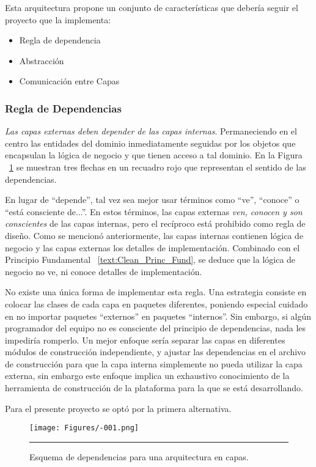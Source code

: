 Esta arquitectura propone un conjunto de características que debería seguir el proyecto que la implementa:

\begin{itemize}
	\item Regla de dependencia
	\item Abstracción
	\item Comunicación entre Capas
\end{itemize}
\subsubsection{Regla de Dependencias}
\emph{Las capas externas deben depender de las capas internas}. Permaneciendo en el centro las entidades del dominio inmediatamente seguidas por los objetos que encapsulan la lógica de negocio y que tienen acceso a tal dominio.  En la Figura ~\ref{fig:Diagrama_clasico} se muestran tres flechas en un recuadro rojo que representan el sentido de las dependencias. 

En lugar de ``depende'', tal vez sea mejor usar términos como ``ve'', ``conoce'' o ``está consciente de...''. En estos términos, las capas externas \emph{ven, conocen y son conscientes} de las capas internas, pero el recíproco está prohibido como regla de diseño. Como se mencionó anteriormente, las capas internas contienen lógica de negocio y las capas externas  los detalles de implementación. Combinado con el Principio Fundamental ~\ref{text:Clean_Princ_Fund}, se deduce que la lógica de negocio no ve, ni conoce detalles de implementación.

No existe una única forma de implementar esta regla. Una estrategia consiste en colocar las clases de cada capa en paquetes diferentes, poniendo especial cuidado en no importar paquetes ``externos'' en paquetes ``internos''. Sin embargo, si algún programador del equipo no es consciente del principio de dependencias, nada les impediría romperlo. Un mejor enfoque sería separar las capas en diferentes módulos de construcción independiente, y ajustar las dependencias en el archivo de construcción para que la capa interna simplemente no pueda utilizar la capa externa, sin embargo este enfoque implica un exhaustivo conocimiento de la herramienta de construcción de la plataforma para la que se está desarrollando.

Para el presente proyecto se optó por la primera alternativa.

\begin{figure}[htbp]
	\centering
	\texttt{[image: Figures/-001.png]}
	\rule{35em}{1pt}
	\caption[Principio de Dependecias]{Esquema de dependencias para una arquitectura en capas.}
	\label{fig:Diagrama_clasico}
\end{figure}

